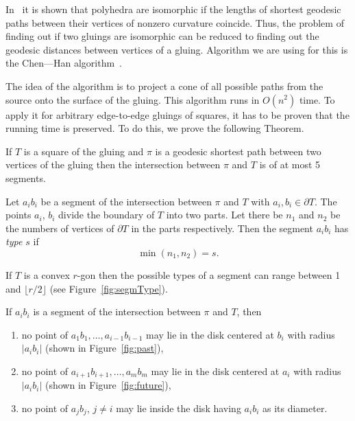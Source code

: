 \documentclass[a4paper,11pt]{article}
\begin{document}
In~\cite{DO07} it is shown that polyhedra are isomorphic if the lengths of shortest geodesic paths between their vertices of nonzero curvature coincide. Thus, the problem of finding out if two gluings are isomorphic can be reduced to finding out the geodesic distances between vertices of a gluing. Algorithm we are using for this is the Chen—Han algorithm~\cite{chen-han}.

The idea of the algorithm is to project a cone of all possible paths from the source onto the surface of the gluing. This algorithm runs in $O(n^2)$ time. To apply it for arbitrary edge-to-edge gluings of squares, it has to be proven that the running time is preserved. To do this, we prove the following Theorem.

\begin{theorem} \label{thm:shortestSquare}
	If $T$ is a square of the gluing and $\pi$ is a geodesic shortest path between two vertices of the gluing then the intersection between $\pi$ and $T$ is of at most 5 segments.
\end{theorem}

\begin{definition}
	Let $a_ib_i$ be a segment of the intersection between $\pi$ and $T$ with $a_i, b_i \in \partial T$. The points $a_i$, $b_i$ divide the boundary of $T$ into two parts. Let there be $n_1$ and $n_2$ be the numbers of vertices of $\partial T$ in the parts respectively. Then the segment $a_ib_i$ has \emph{type $s$} if
	$$\min (n_1, n_2) = s.$$

	If $T$ is a convex $r$-gon then the possible types of a segment can range between 1 and $\lfloor r / 2 \rfloor$ (see Figure~\ref{fig:segmType}).
\end{definition}

\begin{lemma}
\label{lm:pastFuture}
	If $a_ib_i$ is a segment of the intersection between $\pi$ and $T$, then

\begin{enumerate}
	\item \label{item:past} no point of $a_1b_1, \ldots, a_{i-1}b_{i-1}$ may lie in the disk centered at $b_i$ with radius $|a_ib_i|$ (shown in Figure~\ref{fig:past}),
	\item \label{item:future} no point of $a_{i+1}b_{i+1}, \ldots, a_mb_m$ may lie in the disk centered at $a_i$ with radius $|a_ib_i|$ (shown in Figure~\ref{fig:future}),
	\item \label{item:noother} no point of $a_jb_j$, $j \ne i$ may lie inside the disk having $a_ib_i$ as its diameter.
\end{enumerate}
\end{lemma}
\end{document}
